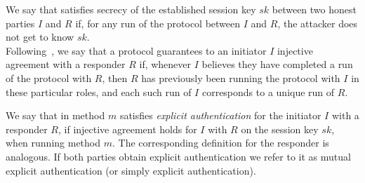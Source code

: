  
We say that \mEdhoc{} satisfies secrecy of the established session key $sk$
between two honest parties $I$ and $R$ if, for any run of the protocol between $I$ and
$R$, the attacker does not get to know $sk$.\\
%

 
Following~\cite{DBLP:conf/csfw/Lowe97a}, we say that a protocol guarantees to an initiator $I$ injective agreement with a responder $R$ if, whenever $I$ believes they have completed a run of the protocol with $R$, then $R$ has previously been running the protocol with $I$ in these particular roles, and each such run of $I$ corresponds to a unique run of $R$.

%
We say that \mEdhoc{} in method $m$ satisfies \emph{explicit authentication} for
the initiator $I$ with a responder $R$, if injective agreement holds for $I$
with $R$ on the session key $sk$, when running method $m$.
%
The corresponding definition for the responder is analogous.
%
If both parties obtain explicit authentication we refer to it as mutual explicit
authentication (or simply explicit authentication).

